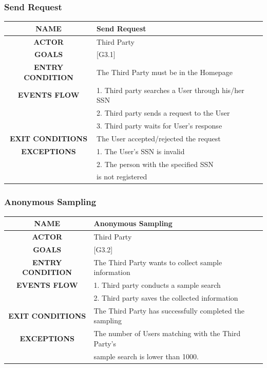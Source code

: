 \documentclass[12pt,a4paper]{article}
\begin{document}
		\subsubsection{Send Request}
		\begin{center}
			\begin{tabular}{| c | l |}
				\hline
				\textbf{NAME} & Send Request \\
				\hline
				\textbf{ACTOR} & Third Party \\
				\hline
				\textbf{GOALS} & [G3.1] \\
				\hline
				\textbf{ENTRY CONDITION} & The Third Party must be in the Homepage \\ \hline
				\textbf{EVENTS FLOW}  &
				1. Third party searches a User through his/her SSN\\
				&2. Third party sends a request to the User\\
				&3. Third party waits for User's response\\
				\hline
				\textbf{EXIT CONDITIONS}  & The User accepted/rejected the request \\ \hline
				\textbf{EXCEPTIONS} & 
				1. The User's SSN is invalid\\
				&2. The person with the specified SSN\\
				&is not registered\\
				\hline
			\end{tabular}
		\end{center}
	
		\subsubsection{Anonymous Sampling}
		\begin{center}
			\begin{tabular}{| c | l |}
				\hline
				\textbf{NAME} & Anonymous Sampling \\
				\hline
				\textbf{ACTOR} & Third Party \\
				\hline
				\textbf{GOALS} & [G3.2] \\
				\hline
				\textbf{ENTRY CONDITION} & The Third Party wants to collect sample information \\ \hline
				\textbf{EVENTS FLOW}  &
				1. Third party conducts a sample search\\
				&2. Third party saves the collected information\\
				\hline
				\textbf{EXIT CONDITIONS}  & The Third Party has successfully completed the sampling \\ \hline
				\textbf{EXCEPTIONS} & 
				The number of Users matching with the Third Party's\\
				&sample search is lower than 1000.\\
				\hline
			\end{tabular}
		\end{center}
	
\end{document}

